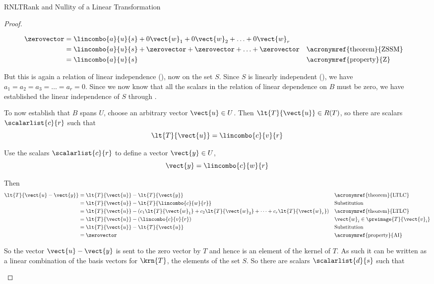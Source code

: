 \begin{subsect}{RNLT}{Rank and Nullity of a Linear Transformation}
\begin{proof}
\begin{para}
\begin{align*}
\zerovector&=\lincombo{a}{u}{s}+0\vect{w}_1+0\vect{w}_2+\ldots+0\vect{w}_r\\
&=\lincombo{a}{u}{s}+\zerovector+\zerovector+\ldots+\zerovector&&\text{\acronymref{theorem}{ZSSM}}\\
&=\lincombo{a}{u}{s}&&\text{\acronymref{property}{Z}}
\end{align*}
\end{para}
%
\begin{para}But this is again a relation of linear independence (), now on the set $S$.  Since $S$ is linearly independent (), we have $a_1=a_2=a_3=\ldots=a_r=0$.  Since we now know that all the scalars in the relation of linear dependence on $B$ must be zero, we have established the linear independence of $S$ through .\end{para}
%
\begin{para}To now establish that $B$ spans $U$, choose an arbitrary vector $\vect{u}\in U$.  Then $\lt{T}{\vect{u}}\in R(T)$, so there are scalars $\scalarlist{c}{r}$ such that
%
\begin{equation*}
\lt{T}{\vect{u}}=\lincombo{c}{v}{r}
\end{equation*}
\end{para}
%
\begin{para}Use the scalars $\scalarlist{c}{r}$ to define a vector $\vect{y}\in U$,
%
\begin{equation*}
\vect{y}=\lincombo{c}{w}{r}
\end{equation*}
\end{para}
%
\begin{para}Then
%
\begin{align*}
\lt{T}{\vect{u}-\vect{y}}&=\lt{T}{\vect{u}}-\lt{T}{\vect{y}}&&\text{\acronymref{theorem}{LTLC}}\\
%
&=\lt{T}{\vect{u}}-\lt{T}{\lincombo{c}{w}{r}}&&\text{Substitution}\\
%
&=\lt{T}{\vect{u}}-\left(c_1\lt{T}{\vect{w}_1}+c_2\lt{T}{\vect{w}_2}+\cdots+c_r\lt{T}{\vect{w}_r}\right)&&\text{\acronymref{theorem}{LTLC}}\\
%
&=\lt{T}{\vect{u}}-\left(\lincombo{c}{v}{r}\right)&&\vect{w}_i\in\preimage{T}{\vect{v}_i}\\
%
&=\lt{T}{\vect{u}}-\lt{T}{\vect{u}}&&\text{Substitution}\\
%
&=\zerovector&&\text{\acronymref{property}{AI}}
\end{align*}
\end{para}
%
\begin{para}So the vector $\vect{u}-\vect{y}$ is sent to the zero vector by $T$ and hence is an element of the kernel of $T$.  As such it can be written as a linear combination of the basis vectors for $\krn{T}$, the elements of the set $S$.  So there are scalars $\scalarlist{d}{s}$ such that

\end{para}
\end{proof}
\end{subsect}
